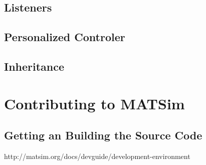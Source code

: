 \subsection{Listeners}

\subsection{Personalized Controler}

\subsection{Inheritance}



\section{Contributing to MATSim}
\subsection{Getting an Building the Source Code}
http://matsim.org/docs/devguide/development-environment




